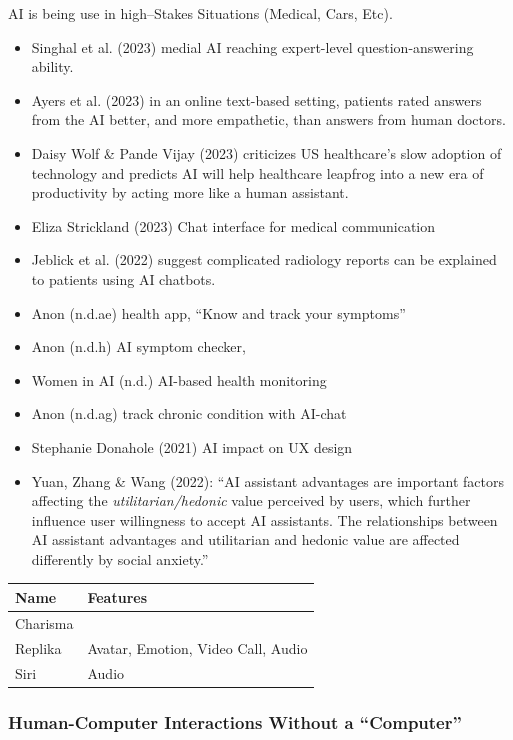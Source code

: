 \documentclass[
  letterpaper,
  DIV=11,
  numbers=noendperiod]{scrartcl}
\begin{document}
AI is being use in high--Stakes Situations (Medical, Cars, Etc).

\begin{itemize}
\item
  Singhal et al. (2023) medial AI reaching expert-level
  question-answering ability.
\item
  Ayers et al. (2023) in an online text-based setting, patients rated
  answers from the AI better, and more empathetic, than answers from
  human doctors.
\item
  Daisy Wolf \& Pande Vijay (2023) criticizes US healthcare's slow
  adoption of technology and predicts AI will help healthcare leapfrog
  into a new era of productivity by acting more like a human assistant.
\item
  Eliza Strickland (2023) Chat interface for medical communication
\item
  Jeblick et al. (2022) suggest complicated radiology reports can be
  explained to patients using AI chatbots.
\item
  Anon (n.d.ae) health app, ``Know and track your symptoms''
\item
  Anon (n.d.h) AI symptom checker,
\item
  Women in AI (n.d.) AI-based health monitoring
\item
  Anon (n.d.ag) track chronic condition with AI-chat
\item
  Stephanie Donahole (2021) AI impact on UX design
\item
  Yuan, Zhang \& Wang (2022): ``AI assistant advantages are important
  factors affecting the \emph{utilitarian/hedonic} value perceived by
  users, which further influence user willingness to accept AI
  assistants. The relationships between AI assistant advantages and
  utilitarian and hedonic value are affected differently by social
  anxiety.''
\end{itemize}

\begin{longtable}[]{@{}ll@{}}
\toprule\noalign{}
Name & Features \\
\midrule\noalign{}
\endhead
\bottomrule\noalign{}
\endlastfoot
Charisma & \\
Replika & Avatar, Emotion, Video Call, Audio \\
Siri & Audio \\
\end{longtable}

\subsubsection{Human-Computer Interactions Without a
``Computer''}\label{human-computer-interactions-without-a-computer}
\end{document}
